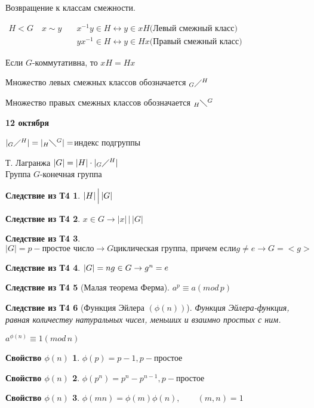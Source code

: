 \documentclass[12pt]{article}
\begin{document}
	Возвращение к классам смежности.
	
	$\begin{aligned}
		H<G \quad x\sim y & \quad x^{-1}y\in H \leftrightarrow y\in xH \text{(Левый смежный класс)} \\
						  & \quad yx^{-1}\in H \leftrightarrow y\in Hx \text{(Правый смежный класс)}
	\end{aligned} $
	
	Если $G$-коммутативна, то $xH=Hx$
	
	Множество левых смежных классов обозначается $_G\diagup^H $
	
	Множество правых смежных классов обозначается $_H\diagdown^G$ 
	
	\textbf{12 октября}
	
	$|_G\diagup^H|=|_H\diagdown^G|=$индекс подгруппы
	
	\begin{Th}
		Т. Лагранжа $|G|=|H|\cdot |_G\diagup^H|$ \\
		Группа $G$-конечная группа		
	\end{Th}
	
	\newtheorem{SL0}{Следствие из Т4}
	\newtheorem{SV0}{Свойство $\phi (n)$}
	
	\begin{SL0}
		$|H| \, \Big{|}\, |G|$
	\end{SL0}
	\begin{SL0}
		$x \in G \rightarrow |x| \, \Big| \, |G| $
	\end{SL0}
	\begin{SL0}
		$|G|=p -\text{простое число}\rightarrow G \text{циклическая группа, причем если} g\not= e \rightarrow G=<g>$
	\end{SL0}
	\begin{SL0}
		$|G|=n\\
		g\in G\rightarrow g^n=e$
	\end{SL0}
	\begin{SL0}[Малая теорема Ферма]
		$a^p \equiv a(mod\, p)$
	\end{SL0}
	\begin{SL0}[Функция Эйлера $(\phi (n))$]
		Функция Эйлера-функция, равная количеству натуральных чисел, меньших и взаимно простых с ним.
		
	\end{SL0}
	\begin{Th}
		$a^{\phi(n)} \equiv 1(mod \, n) $
	\end{Th}
	\begin{SV0}
		$\phi(p)=p-1, p-\text{простое}$
	\end{SV0}
	\begin{SV0}
		$\phi(p^n)=p^n-p^{n-1}, p-\text{простое}$
	\end{SV0}
	\begin{SV0}
		$\phi(mn)=\phi(m)\phi(n), \qquad (m,n)=1$
	\end{SV0}
	
\end{document}

